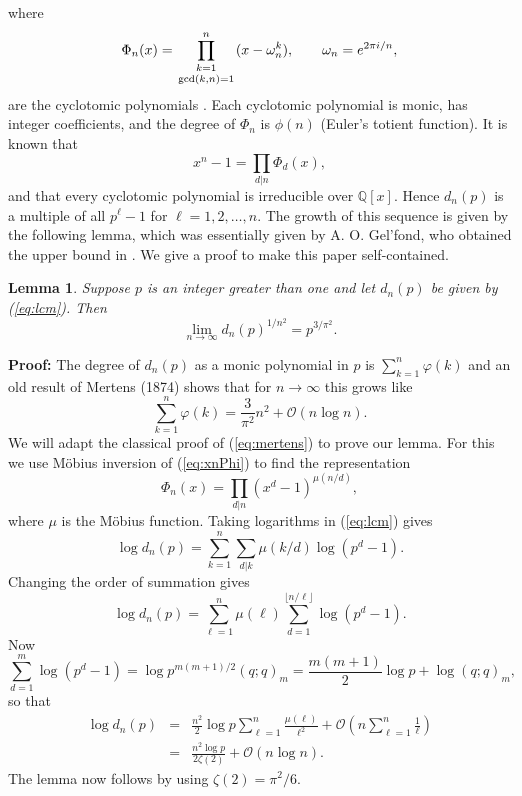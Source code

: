 \documentclass[12pt]{article}
\newtheorem{lemma}{Lemma}
\begin{document}
where
\begin{equation}
    \Phi_n(x) = \prod_{\genfrac{}{}{0pt}1{k=1}{\gcd(k,n)=1}}^n 
   (x-\omega_n^k), 
\qquad \omega_n = e^{2\pi i/n},
\end{equation}
are the cyclotomic polynomials \cite[\S 4.8]{St}. Each cyclotomic polynomial
is monic, has integer coefficients, and the degree of
$\Phi_n$ is $\phi(n)$ (Euler's totient function). It is known that
\begin{equation}   \label{eq:xnPhi}
   x^n-1 = \prod_{d | n} \Phi_d(x), 
\end{equation}
and that every cyclotomic polynomial is irreducible over $\mathbb{Q}[x]$.
Hence $d_n(p)$ is a multiple of all $p^\ell-1$ for $\ell=1,2,\ldots,n$.
The growth of this sequence is given by the following lemma, which
was essentially given by A. O. Gel'fond, who obtained
the upper bound in \cite[Equation (7)]{Ge}. We give a proof to
make this paper self-contained.

\begin{lemma}  \label{lm:dn}
Suppose $p$ is an integer greater than one and let $d_n(p)$
be given by (\ref{eq:lcm}). Then
\begin{equation}  \label{eq:dn}
    \lim_{n \to \infty} d_n(p)^{1/n^2} = p^{3/\pi^2}.
\end{equation}
\end{lemma}
\textbf{Proof:}
The degree of $d_n(p)$ as a monic polynomial in $p$ is $\sum_{k=1}^n \varphi(k)$
and an old result of Mertens (1874) shows that for $n \to \infty$ this 
grows like \cite[Theorem 330]{HW}
\begin{equation}   \label{eq:mertens}
  \sum_{k=1}^n \varphi(k) = \frac{3}{\pi^2} n^2 + \mathcal{O}(n\log n). 
\end{equation}
We will adapt the classical proof of (\ref{eq:mertens}) to prove our lemma.
For this we use M\"obius inversion of (\ref{eq:xnPhi}) to find the representation
\[   \Phi_n(x) = \prod_{d | n} (x^d-1)^{\mu(n/d)}, \]
where $\mu$ is the M\"obius function. Taking logarithms in (\ref{eq:lcm})
gives
\[    \log d_n(p) = \sum_{k=1}^n \sum_{d | k} \mu(k/d) \log (p^d-1). \]
Changing the order of summation gives
\[      \log d_n(p) = \sum_{\ell=1}^n \mu(\ell) \sum_{d=1}^{\lfloor n/\ell \rfloor} \log (p^d-1). \]
Now
\[   \sum_{d=1}^m \log (p^d-1) = \log  p^{m(m+1)/2} (q;q)_m = \frac{m(m+1)}2 \log p + \log (q;q)_m, \]
so that
\begin{eqnarray*}
  \log d_n(p) & = & \frac{n^2}{2} \log p \sum_{\ell=1}^n  \frac{\mu(\ell)}{\ell^2}
    + \mathcal{O}\left(n \sum_{\ell=1}^n \frac{1}{\ell} \right) \\
    & = & \frac{n^2 \log p}{2 \zeta(2)} + \mathcal{O}(n\log n). 
\end{eqnarray*} 
The lemma now follows by using $\zeta(2) = \pi^2/6$.
\ \framebox{}
\bigskip
\end{document}
